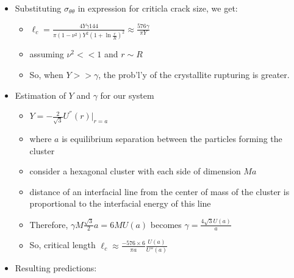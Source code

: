 \documentclass[11pt]{article}
\begin{document}
\begin{itemize}
\item Substituting  $\sigma_{\theta \theta}$ in expression for criticla crack size, we get:
\label{sec-3-1-5-6}%
\begin{itemize}

\item $\ell_c = \frac{ 4 Y \gamma 144}{\pi (1-\nu^2) Y^2 (1+ \ln \frac{r}{R})^2} \approx \frac{576 \gamma}{\pi Y}$\\
\label{sec-3-1-5-6-1}%
\item assuming $\nu^2 << 1$ and $r \sim R$\\
\label{sec-3-1-5-6-2}%
\item So, when $Y >> \gamma$, the prob'l'y of the crystallite rupturing is greater.\\
\label{sec-3-1-5-6-3}%
\end{itemize} %

\item Estimation of $Y$ and $\gamma$ for our system
\label{sec-3-1-5-7}%
\begin{itemize}

\item $Y = - \frac{2}{\sqrt{3}} U^{''}(r)|_{r=a}$\\
\label{sec-3-1-5-7-1}%
\item where $a$ is equilibrium separation between the particles forming the cluster\\
\label{sec-3-1-5-7-2}%
\item consider a hexagonal cluster with each side of dimension $M a$\\
\label{sec-3-1-5-7-3}%
\item distance of an interfacial line from the center of mass of the cluster is proportional to the interfacial energy of this line\\
\label{sec-3-1-5-7-4}%
\item Therefore, $\gamma M  \frac{\sqrt{3}}{2} a  =  6 M U(a)$ becomes  $\gamma  = \frac{4\sqrt{3} U(a)}{a}$\\
\label{sec-3-1-5-7-5}%
\item So, critical length  $\ell_c \approx  \frac{- 576 \times 6}{\pi a} \frac{U(a)}{U''(a)}$\\
\label{sec-3-1-5-7-6}%
\end{itemize} %

\item Resulting predictions:
\label{sec-3-1-5-8}%
\begin{itemize}


\end{itemize}
\end{itemize}
\end{document}
